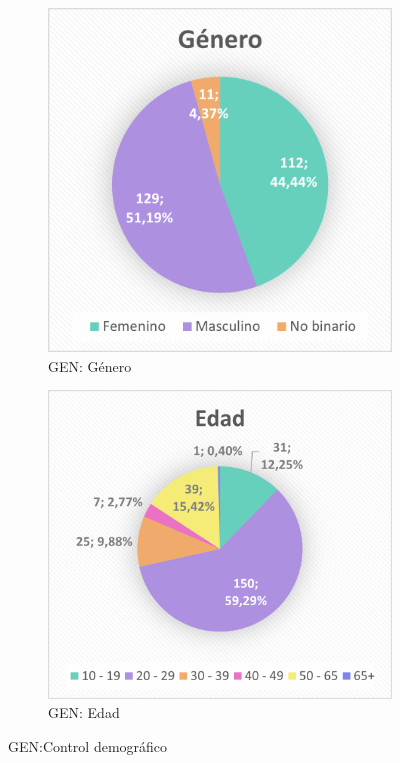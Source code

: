 \documentclass[12pt, a4paper,twoside,titlepage]{book}
\begin{document}
\begin{figure}
\centering
\begin{subfigure}{.5\textwidth}
  \centering
  \includegraphics[width=.9\linewidth]{Imagenes Form GEN/1GENGenre}
  \caption{GEN: Género}
\end{subfigure}%
\begin{subfigure}{.5\textwidth}
  \centering
  \includegraphics[width=.9\linewidth]{Imagenes Form GEN/2GENAge}
  \caption{GEN: Edad}
\end{subfigure}
\caption{GEN:Control demográfico}
\label{fig:GenAge}
\end{figure}
\end{document}
